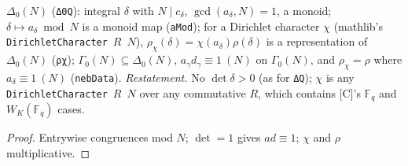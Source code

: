 \begin{definition}\label{def:nebdata-model}
  \leanok
  $\Delta_0(N)$ (\texttt{Δ0Q}): integral $\delta$ with $N\mid c_\delta$, $\gcd(a_\delta,N)=1$, a monoid; $\delta\mapsto a_\delta\bmod N$ is a
  monoid map (\texttt{aMod}); for a Dirichlet character $\chi$ (mathlib's \texttt{DirichletCharacter}~$R$~$N$),
  $\rho_\chi(\delta)=\chi(a_\delta)\rho(\delta)$ is a representation of $\Delta_0(N)$ (\texttt{ρχ}); $\Gamma_0(N)\subseteq\Delta_0(N)$,
  $a_\gamma d_\gamma\equiv1\ (N)$ on $\Gamma_0(N)$, and $\rho_\chi=\rho$ where $a_\delta\equiv1\ (N)$ (\texttt{nebData}).
  \emph{Restatement.} No $\det\delta>0$ (as for \texttt{ΔQ}); $\chi$ is any \texttt{DirichletCharacter}~$R$~$N$ over any commutative $R$, which
  contains [C]'s $\mathbb F_q$ and $W_K(\mathbb F_q)$ cases.
\end{definition}
\begin{proof}
  \leanok
  Entrywise congruences mod $N$; $\det=1$ gives $a d\equiv1$; $\chi$ and $\rho$ multiplicative.
\end{proof}

